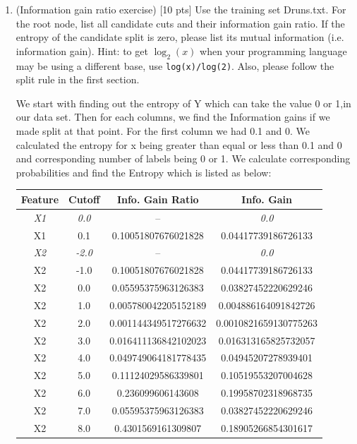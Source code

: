 \documentclass[a4paper]{article}
\theoremstyle{definition}
\newenvironment{soln}{
    \leavevmode\color{blue}\ignorespaces
}{}
\begin{document}
\begin{enumerate}
\begin{soln}
    
\end{soln}

\item (Information gain ratio exercise)  [10 pts] Use the training set Druns.txt.  For the root node, list all candidate cuts and their information gain ratio. If the entropy of the candidate split is zero, please list its mutual information (i.e. information gain). Hint: to get $\log_2(x)$ when your programming language may be using a different base, use \verb|log(x)/log(2)|. Also, please follow the split rule in the first section. \\
\begin{soln}
    We start with finding out the entropy of Y which can take the value 0 or 1,in our data set. Then for each columns, we find the Information gains if we made split at that point. For the first column we had 0.1 and 0. We calculated the entropy for x being greater than equal or less than 0.1 and 0 and corresponding number of labels being 0 or 1. We calculate corresponding probabilities and find the Entropy which is listed as below:\\
    \begin{tabular}{|c|c|c|c|}
        \hline
        \textbf{Feature} & \textbf{Cutoff} & \textbf{Info. Gain Ratio} & \textbf{Info. Gain} \\
        \hline
        \textit{X1} & \textit{0.0} & -- & \textit{0.0} \\
        X1 & 0.1 & 0.10051807676021828 & 0.04417739186726133 \\
        \hline
        \textit{X2} & \textit{-2.0} & -- & \textit{0.0} \\
        X2 & -1.0 & 0.10051807676021828 & 0.04417739186726133 \\
        X2 & 0.0 & 0.05595375963126383 & 0.03827452220629246\\
        X2 & 1.0 & 0.005780042205152189 & 0.004886164091842726 \\
        X2 & 2.0 & 0.001144349517276632 & 0.0010821659130775263 \\
        X2 & 3.0 & 0.016411136842102023 & 0.016313165825732057 \\
        X2 & 4.0 & 0.049749064181778435 & 0.04945207278939401 \\
        X2 & 5.0 & 0.11124029586339801 & 0.10519553207004628 \\
        X2 & 6.0 & 0.236099606143608 & 0.19958702318968735 \\
        X2 & 7.0 & 0.05595375963126383 & 0.03827452220629246 \\
        X2 & 8.0 & 0.4301569161309807 & 0.18905266854301617 \\
        \hline
    \end{tabular}
\end{soln}


\end{enumerate}
\end{document}
